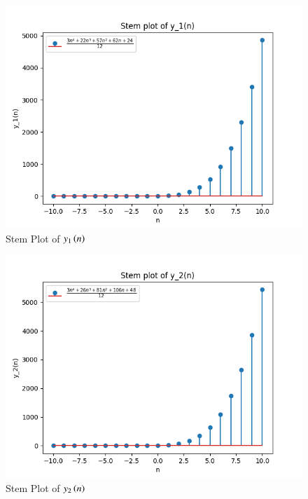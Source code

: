 \documentclass[journal,12pt,twocolumn]{IEEEtran}
\theoremstyle{remark}
\begin{document}
\begin{figure}[htbp]
    \centering
    \includegraphics[width=1\columnwidth]{y1_plot.png}
    \caption{Stem Plot of $y_1\left(n\right)$}
    \label{fig:y1}
\end{figure}

\begin{figure}[htbp]
    \centering
    \includegraphics[width=1\columnwidth]{y2_plot.png}
    \caption{Stem Plot of $y_2\left(n\right)$}
    \label{fig:y2}
\end{figure}
\end{document}
